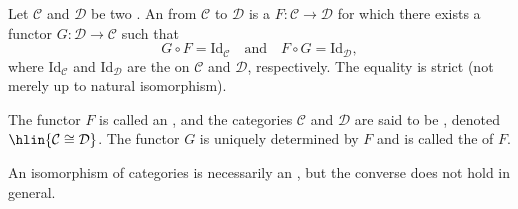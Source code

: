 \begin{definition} \label{definition:isomorphism_of_categories}
Let $\mathcal{C}$ and $\mathcal{D}$ be two . An  from $\mathcal{C}$ to $\mathcal{D}$ is a  $F : \mathcal{C} \to \mathcal{D}$ for which there exists a functor $G : \mathcal{D} \to \mathcal{C}$ such that
$$G \circ F = \mathrm{Id}_{\mathcal{C}} \quad \text{and} \quad F \circ G = \mathrm{Id}_{\mathcal{D}},$$
where $\mathrm{Id}_{\mathcal{C}}$ and $\mathrm{Id}_{\mathcal{D}}$ are the  on $\mathcal{C}$ and $\mathcal{D}$, respectively. The equality is strict (not merely up to natural isomorphism).

The functor $F$ is called an , and the categories $\mathcal{C}$ and $\mathcal{D}$ are said to be , denoted $\hlin{\mathcal{C} \cong \mathcal{D}}$. The functor $G$ is uniquely determined by $F$ and is called the  of $F$.

An isomorphism of categories is necessarily an , but the converse does not hold in general.
\end{definition}
